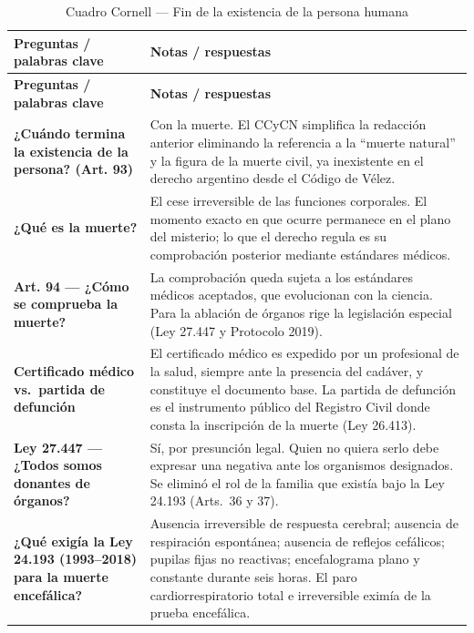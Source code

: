 \documentclass[12pt,oneside]{book}
\begin{document}
\begin{longtable}{
    >{\raggedright\arraybackslash}p{}
    >{\raggedright\arraybackslash}p{}
}
\caption{Cuadro Cornell --- Fin de la existencia de la persona humana} \\
\toprule
\textbf{Preguntas / palabras clave} & \textbf{Notas / respuestas} \\
\midrule
\endfirsthead

\toprule
\textbf{Preguntas / palabras clave} & \textbf{Notas / respuestas} \\
\midrule
\endhead

\textbf{¿Cuándo termina la existencia de la persona? (Art. 93)} &
Con la muerte. El CCyCN simplifica la redacción anterior eliminando la referencia a la ``muerte natural'' y la figura de la muerte civil, ya inexistente en el derecho argentino desde el Código de Vélez. \\

\textbf{¿Qué es la muerte?} &
El cese irreversible de las funciones corporales. El momento exacto en que ocurre permanece en el plano del misterio; lo que el derecho regula es su comprobación posterior mediante estándares médicos. \\

\textbf{Art. 94 --- ¿Cómo se comprueba la muerte?} &
La comprobación queda sujeta a los estándares médicos aceptados, que evolucionan con la ciencia. Para la ablación de órganos rige la legislación especial (Ley 27.447 y Protocolo 2019). \\

\textbf{Certificado médico vs.\ partida de defunción} &
El certificado médico es expedido por un profesional de la salud, siempre ante la presencia del cadáver, y constituye el documento base. La partida de defunción es el instrumento público del Registro Civil donde consta la inscripción de la muerte (Ley 26.413). \\

\textbf{Ley 27.447 --- ¿Todos somos donantes de órganos?} &
Sí, por presunción legal. Quien no quiera serlo debe expresar una negativa ante los organismos designados. Se eliminó el rol de la familia que existía bajo la Ley 24.193 (Arts.\ 36 y 37). \\

\textbf{¿Qué exigía la Ley 24.193 (1993--2018) para la muerte encefálica?} &
Ausencia irreversible de respuesta cerebral; ausencia de respiración espontánea; ausencia de reflejos cefálicos; pupilas fijas no reactivas; encefalograma plano y constante durante seis horas. El paro cardiorrespiratorio total e irreversible eximía de la prueba encefálica. \\


\end{longtable}
\end{document}
